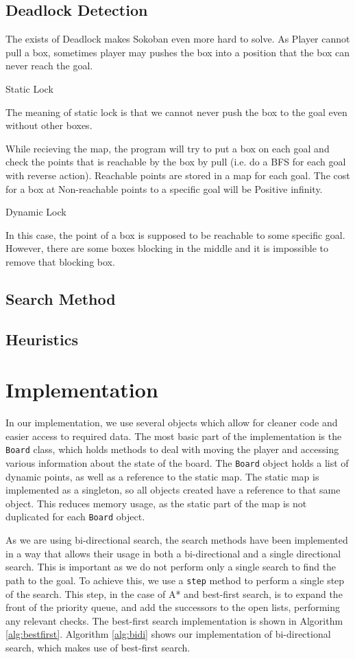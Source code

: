 \documentclass[a4paper,11pt]{article}
\begin{document}
\subsection{Deadlock Detection}
The exists of Deadlock makes Sokoban even more hard to solve. As Player cannot
pull a box, sometimes player may pushes the box into a position that the box can
never reach the goal.

Static Lock

The meaning of static lock is that we cannot never push the box to the goal even
without other boxes.

While recieving the map, the program will try to put a box on each goal and
check the points that is reachable by the box by pull (i.e. do a BFS for each
goal with reverse action). Reachable points are stored in a map for each
goal. The cost for a box at Non-reachable points to a specific goal will be
Positive infinity.

Dynamic Lock

In this case, the point of a box is supposed to be reachable to some specific
goal. However, there are some boxes blocking in the middle and it is impossible
to remove that blocking box.

\subsection{Search Method}

\subsection{Heuristics}

\section{Implementation}
In our implementation, we use several objects which allow for cleaner code and
easier access to required data. The most basic part of the implementation is the
\texttt{Board} class, which holds methods to deal with moving the player and
accessing various information about the state of the board. The \texttt{Board}
object holds a list of dynamic points, as well as a reference to the static
map. The static map is implemented as a singleton, so all objects created have a
reference to that same object. This reduces memory usage, as the static part of
the map is not duplicated for each \texttt{Board} object.

As we are using bi-directional search, the search methods have been implemented
in a way that allows their usage in both a bi-directional and a single
directional search. This is important as we do not perform only a single search
to find the path to the goal. To achieve this, we use a \texttt{step} method to
perform a single step of the search. This step, in the case of A* and best-first
search, is to expand the front of the priority queue, and add the successors to
the open lists, performing any relevant checks. The best-first search
implementation is shown in Algorithm \ref{alg:bestfirst}. Algorithm
\ref{alg:bidi} shows our implementation of bi-directional search, which makes
use of best-first search.
\end{document}
